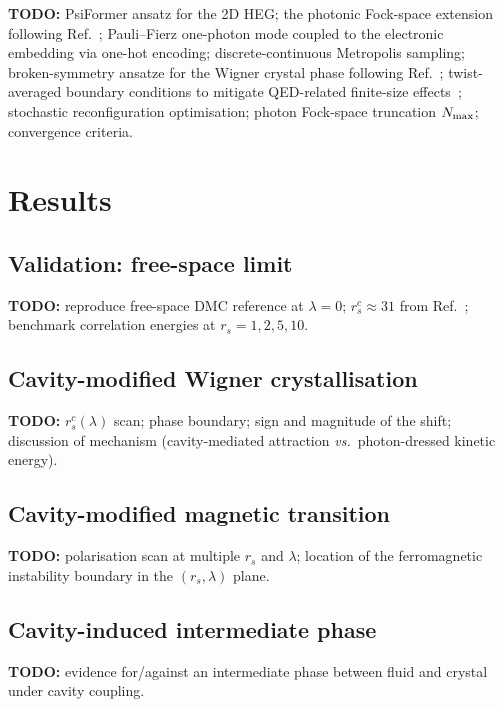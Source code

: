\documentclass[aps,prl,reprint,superscriptaddress,longbibliography]{revtex4-2}
\begin{document}
\textbf{TODO:} PsiFormer ansatz for the 2D HEG; the photonic Fock-space
extension following Ref.~\cite{Tang2025}; Pauli–Fierz one-photon mode
coupled to the electronic embedding via one-hot encoding;
discrete-continuous Metropolis sampling; broken-symmetry ansatze for the
Wigner crystal phase following Ref.~\cite{Cassella2023};
twist-averaged boundary conditions to mitigate QED-related finite-size
effects~\cite{Weber2025}; stochastic reconfiguration optimisation;
photon Fock-space truncation $N_{\rm max}$; convergence criteria.

\section{Results}\label{sec:results}

\subsection{Validation: free-space limit}

\textbf{TODO:} reproduce free-space DMC reference at $\lambda = 0$;
$r_s^c \approx 31$ from Ref.~\cite{DrummondNeeds2009}; benchmark
correlation energies at $r_s = 1, 2, 5, 10$.

\subsection{Cavity-modified Wigner crystallisation}

\textbf{TODO:} $r_s^c(\lambda)$ scan; phase boundary; sign and
magnitude of the shift; discussion of mechanism (cavity-mediated
attraction \emph{vs.}\ photon-dressed kinetic energy).

\subsection{Cavity-modified magnetic transition}

\textbf{TODO:} polarisation scan at multiple $r_s$ and $\lambda$;
location of the ferromagnetic instability boundary in the
$(r_s, \lambda)$ plane.

\subsection{Cavity-induced intermediate phase}

\textbf{TODO:} evidence for/against an intermediate phase between fluid
and crystal under cavity coupling.
\end{document}
